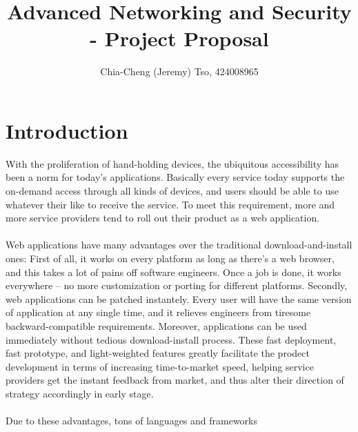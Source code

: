 \documentclass[12pt, a4paper]{article}
\title{
    Advanced Networking and Security\\
    - Project Proposal
    \vspace{-2ex}
}
\author{
    \normalfont \normalsize 
    Chia-Cheng (Jeremy) Tso, 
    424008965
    \vspace{-5ex}
}
\date{
    \normalfont \normalsize 
    \vspace{-9ex}
}
\begin{document}
\maketitle
%

\section{Introduction}
With the proliferation of hand-holding devices,
the ubiquitous accessibility has been a norm for today's applications.
Basically every service today supports the on-demand access through all kinds of devices,
and users should be able to use whatever their like to receive the service.
To meet this requirement, more and more service providers tend to roll
out their product as a
web application.
\\\\
Web applications have many advantages over the traditional download-and-install ones:
First of all, it works on every platform as long as there's a web browser, and
this takes a lot of pains off software engineers. Once a job is done, it works everywhere
-- no more customization or porting for different platforms.
Secondly, web applications can be patched instantely.
Every user will have the same version of application at any single time,
and it relieves engineers from
tiresome backward-compatible requirements.
Moreover,
applications can be used immediately without tedious download-install process.
These fast deployment, fast prototype, and light-weighted features
greatly facilitate the prodect development in terms of
increasing time-to-market speed,
helping service providers get the instant
feedback from market, and thus alter their direction of strategy accordingly in early stage.
\\\\
Due to these advantages, tons of languages and frameworks
\end{document}

